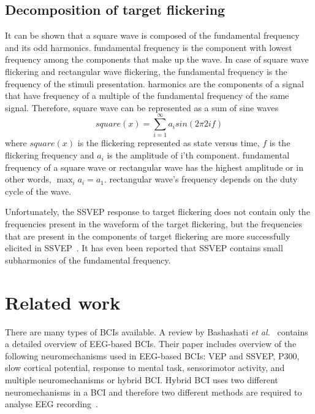 \subsection{Decomposition of target flickering}

It can be shown that a square wave is composed of the \gls{fundamental} frequency and its odd \glspl{harmonic}. \Gls{fundamental} frequency is the component with lowest frequency among the components that make up the wave. In case of \gls{square wave} \gls{flickering} and \gls{rectangular wave} \gls{flickering}, the \gls{fundamental} frequency is the frequency of the stimuli presentation. \Glspl{harmonic} are the components of a signal that have frequency of a multiple of the fundamental frequency of the same signal. Therefore, \gls{square wave} can be represented as a sum of sine waves
\begin{equation}
	\label{eq:square}
	square(x) = \sum_{i=1}^{\infty}a_i sin(2\pi 2if)
\end{equation}
where $square(x)$ is the flickering represented as state versus time, $f$ is the flickering frequency and $a_i$ is the amplitude of i'th component. \Gls{fundamental} frequency of a square wave or rectangular wave has the highest amplitude or in other words, $\max_i a_i=a_1$. \Gls{rectangular wave}'s frequency depends on the \gls{duty cycle} of the wave.

Unfortunately, the \gls{SSVEP} response to \gls{target} \gls{flickering} does not contain only the frequencies present in the waveform of the \gls{target} \gls{flickering}, but the frequencies that are present in the components of \gls{target} \gls{flickering} are more successfully elicited in \gls{SSVEP}~\cite{square_sine}. It has even been reported that \gls{SSVEP} contains small subharmonics of the fundamental frequency.

\section{Related work}

There are many types of \glspl{BCI} available. A review by Bashashati \textit{et al.}~\cite{bci_comparison} contains a detailed overview of \gls{EEG}-based \glspl{BCI}. Their paper includes overview of the following neuromechanisms used in \gls{EEG}-based \glspl{BCI}: \gls{VEP} and \gls{SSVEP}, P300, slow cortical potential, response to mental task, sensorimotor activity, and multiple neuromechanisms or hybrid \gls{BCI}. Hybrid \gls{BCI} uses two different neuromechanisms in a \gls{BCI} and therefore two different methods are required to analyse \gls{EEG} recording~\cite{hybrid_bci, hybrid_bci2}. %


